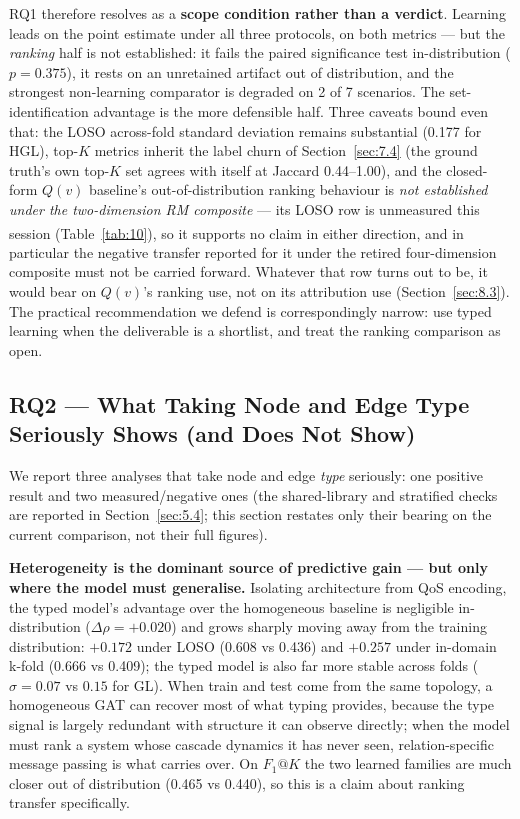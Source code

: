 RQ1 therefore resolves as a \textbf{scope condition rather than a verdict}. Learning leads on the
point estimate under all three protocols, on both metrics --- but the \emph{ranking} half is not
established: it fails the paired significance test in-distribution (\(p=0.375\)), it rests on an
unretained artifact out of distribution, and the strongest non-learning comparator is degraded on 2
of 7 scenarios. The set-identification advantage is the more defensible half. Three caveats bound
even that: the LOSO across-fold standard deviation remains substantial (0.177 for HGL), top-\(K\)
metrics inherit the label churn of Section~\ref{sec:7.4} (the ground truth's own top-\(K\) set agrees
with itself at Jaccard 0.44--1.00), and the closed-form \(Q(v)\) baseline's out-of-distribution
ranking behaviour is \emph{not established under the two-dimension RM composite} --- its LOSO row is
unmeasured this session (Table~\ref{tab:10}\textsuperscript{\dag}), so it supports no claim in either
direction, and in particular the negative transfer reported for it under the retired four-dimension
composite must not be carried forward. Whatever that row turns out to be, it would bear on \(Q(v)\)'s
ranking use, not on its attribution use (Section~\ref{sec:8.3}). The practical recommendation we
defend is correspondingly narrow: use typed learning when the deliverable is a shortlist, and treat
the ranking comparison as open.

\hypertarget{rq2-what-taking-node-and-edge-type-seriously-shows-and-does-not-show}{%
\subsection{RQ2 --- What Taking Node and Edge Type Seriously Shows (and Does Not Show)}\label{rq2-what-taking-node-and-edge-type-seriously-shows-and-does-not-show}}

\label{sec:8.2}

We report three analyses that take node and edge \emph{type} seriously: one positive result and two
measured/negative ones (the shared-library and stratified checks are reported in
Section~\ref{sec:5.4}; this section restates only their bearing on the current comparison, not their
full figures).

\textbf{Heterogeneity is the dominant source of predictive gain --- but only where the model must
generalise.} Isolating architecture from QoS encoding, the typed model's advantage over the
homogeneous baseline is negligible in-distribution (\(\Delta\rho=+0.020\)) and grows sharply moving
away from the training distribution: \(+0.172\) under LOSO (0.608 vs 0.436) and \(+0.257\) under
in-domain k-fold (0.666 vs 0.409); the typed model is also far more stable across folds
(\(\sigma=0.07\) vs \(0.15\) for GL). When train and test come from the same topology, a homogeneous
GAT can recover most of what typing provides, because the type signal is largely redundant with
structure it can observe directly; when the model must rank a system whose cascade dynamics it has
never seen, relation-specific message passing is what carries over. On \(F_1@K\) the two learned
families are much closer out of distribution (0.465 vs 0.440), so this is a claim about ranking
transfer specifically.

